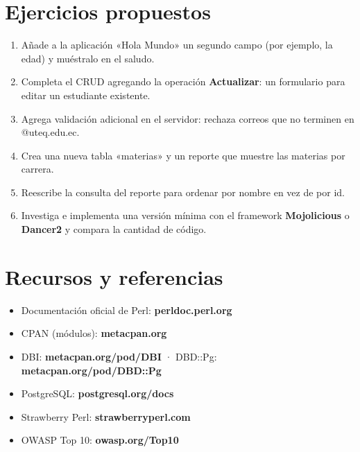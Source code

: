 \documentclass[11pt]{article}
\begin{document}
\section{Ejercicios propuestos}
\begin{enumerate}[leftmargin=1.6em,itemsep=2pt,topsep=2pt]
\item Añade a la aplicación «Hola Mundo» un segundo campo (por ejemplo, la edad) y muéstralo en el saludo.
\item Completa el CRUD agregando la operación \textbf{Actualizar}: un formulario para editar un estudiante existente.
\item Agrega validación adicional en el servidor: rechaza correos que no terminen en @uteq.edu.ec.
\item Crea una nueva tabla «materias» y un reporte que muestre las materias por carrera.
\item Reescribe la consulta del reporte para ordenar por nombre en vez de por id.
\item Investiga e implementa una versión mínima con el framework \textbf{Mojolicious} o \textbf{Dancer2} y compara la cantidad de código.
\end{enumerate}
\section{Recursos y referencias}
\begin{itemize}[leftmargin=1.4em,itemsep=2pt,topsep=2pt]
\item Documentación oficial de Perl: \textbf{perldoc.perl.org}
\item CPAN (módulos): \textbf{metacpan.org}
\item DBI: \textbf{metacpan.org/pod/DBI}  ·  DBD::Pg: \textbf{metacpan.org/pod/DBD::Pg}
\item PostgreSQL: \textbf{postgresql.org/docs}
\item Strawberry Perl: \textbf{strawberryperl.com}
\item OWASP Top 10: \textbf{owasp.org/Top10}
\end{itemize}
\end{document}
